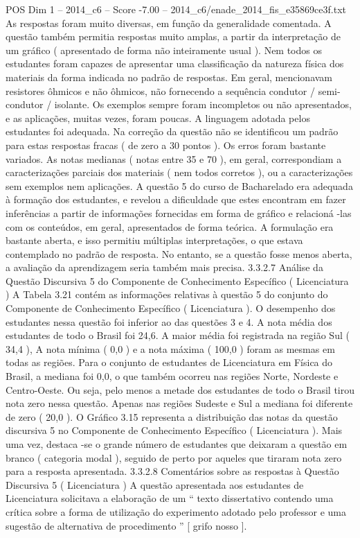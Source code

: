 \begin{textsample}{POS Dim 1 – 2014\_c6 – Score -7.00 – 2014\_c6/enade\_2014\_fis\_e35869ce3f.txt}
As respostas foram muito diversas, em função da generalidade comentada.
A questão também permitia respostas muito amplas, a partir da interpretação de um gráfico ( apresentado de forma não inteiramente usual ).
Nem todos os estudantes foram capazes de apresentar uma classificação da natureza física dos materiais da forma indicada no padrão de respostas.
Em geral, mencionavam resistores ôhmicos e não ôhmicos, não fornecendo a sequência condutor / semi-condutor / isolante.
Os exemplos sempre foram incompletos ou não apresentados, e as aplicações, muitas vezes, foram poucas.
A linguagem adotada pelos estudantes foi adequada.
Na correção da questão não se identificou um padrão para estas respostas fracas ( de zero a 30 pontos ).
Os erros foram bastante variados.
As notas medianas ( notas entre 35 e 70 ), em geral, correspondiam a caracterizações parciais dos materiais ( nem todos corretos ), ou a caracterizações sem exemplos nem aplicações.
A questão 5 do curso de Bacharelado era adequada à formação dos estudantes, e revelou a dificuldade que estes encontram em fazer inferências a partir de informações fornecidas em forma de gráfico e relacioná -las com os conteúdos, em geral, apresentados de forma teórica.
A formulação era bastante aberta, e isso permitiu múltiplas interpretações, o que estava contemplado no padrão de resposta.
No entanto, se a questão fosse menos aberta, a avaliação da aprendizagem seria também mais precisa. 3.3.2.7 Análise da Questão Discursiva 5 do Componente de Conhecimento Específico ( Licenciatura ) A Tabela 3.21 contém as informações relativas à questão 5 do conjunto do Componente de Conhecimento Específico ( Licenciatura ).
O desempenho dos estudantes nessa questão foi inferior ao das questões 3 e 4.
A nota média dos estudantes de todo o Brasil foi 24,6.
A maior média foi registrada na região Sul ( 34,4 ), A nota mínima ( 0,0 ) e a nota máxima ( 100,0 ) foram as mesmas em todas as regiões.
Para o conjunto de estudantes de Licenciatura em Física do Brasil, a mediana foi 0,0, o que também ocorreu nas regiões Norte, Nordeste e Centro-Oeste.
Ou seja, pelo menos a metade dos estudantes de todo o Brasil tirou nota zero nessa questão.
Apenas nas regiões Sudeste e Sul a mediana foi diferente de zero ( 20,0 ).
O Gráfico 3.15 representa a distribuição das notas da questão discursiva 5 no Componente de Conhecimento Específico ( Licenciatura ).
Mais uma vez, destaca -se o grande número de estudantes que deixaram a questão em branco ( categoria modal ), seguido de perto por aqueles que tiraram nota zero para a resposta apresentada. 3.3.2.8 Comentários sobre as respostas à Questão Discursiva 5 ( Licenciatura ) A questão apresentada aos estudantes de Licenciatura solicitava a elaboração de um “ texto dissertativo contendo uma crítica sobre a forma de utilização do experimento adotado pelo professor e uma sugestão de alternativa de procedimento ” [ grifo nosso ].

\end{textsample}
